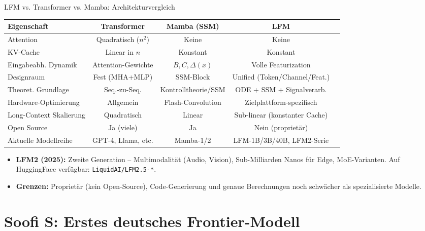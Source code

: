 \documentclass[aspectratio=1610, xcolor=dvipsnames, 9pt]{beamer}
\begin{document}
\begin{frame}{LFM vs. Transformer vs. Mamba: Architekturvergleich}
  \centering
  \footnotesize
  \begin{tabular}{@{}lcccc@{}}
    \hline
    \textbf{Eigenschaft}         & \textbf{Transformer} & \textbf{Mamba (SSM)} & \textbf{LFM} \\
    \hline
    Attention                    & Quadratisch ($n^2$)  & Keine                & Keine \\
    KV-Cache                     & Linear in $n$        & Konstant             & Konstant \\
    Eingabeabh. Dynamik          & Attention-Gewichte   & $B,C,\Delta(x)$      & Volle Featurization \\
    Designraum                   & Fest (MHA+MLP)       & SSM-Block            & Unified (Token/Channel/Feat.) \\
    Theoret. Grundlage           & Seq.-zu-Seq.         & Kontrolltheorie/SSM  & ODE + SSM + Signalverarb. \\
    Hardware-Optimierung         & Allgemein            & Flash-Convolution    & Zielplattform-spezifisch \\
    Long-Context Skalierung      & Quadratisch          & Linear               & Sub-linear (konstanter Cache) \\
    Open Source                  & Ja (viele)           & Ja                   & Nein (proprietär) \\
    Aktuelle Modellreihe         & GPT-4, Llama, etc.  & Mamba-1/2            & LFM-1B/3B/40B, LFM2-Serie \\
    \hline
  \end{tabular}
  \vspace{0.3cm}
  \begin{itemize}
    \item \textbf{LFM2 (2025):} Zweite Generation -- Multimodalität (Audio, Vision), Sub-Milliarden Nanos für Edge, MoE-Varianten. Auf HuggingFace verfügbar: \texttt{LiquidAI/LFM2.5-*}.
    \item \textbf{Grenzen:} Proprietär (kein Open-Source), Code-Generierung und genaue Berechnungen noch schwächer als spezialisierte Modelle.
  \end{itemize}
\end{frame}

\section{Soofi S: Erstes deutsches Frontier-Modell}
\end{document}
